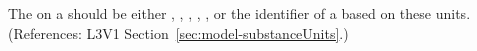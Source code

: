 The  on a \Model should be either ,
 , , , ,
 or the identifier of a \UnitDefinition based
on these units.  (References: L3V1 Section~\ref{sec:model-substanceUnits}.)
